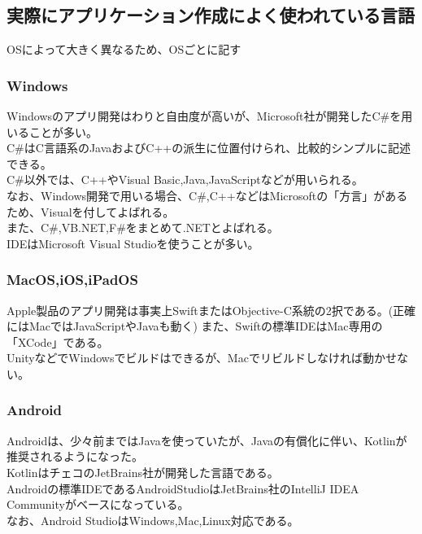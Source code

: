 \documentclass{ltjsarticle}
\begin{document}
\subsection{実際にアプリケーション作成によく使われている言語}
OSによって大きく異なるため、OSごとに記す
\subsubsection{Windows}
Windowsのアプリ開発はわりと自由度が高いが、Microsoft社が開発したC\#を用いることが多い。\\
C\#はC言語系のJavaおよびC++の派生に位置付けられ、比較的シンプルに記述できる。\\
C\#以外では、C++やVisual Basic,Java,JavaScriptなどが用いられる。\\
なお、Windows開発で用いる場合、C\#,C++などはMicrosoftの「方言」があるため、Visualを付してよばれる。\\
また、C\#,VB.NET,F\#をまとめて.NETとよばれる。\\
IDEはMicrosoft Visual Studioを使うことが多い。
\subsubsection{MacOS,iOS,iPadOS}
Apple製品のアプリ開発は事実上SwiftまたはObjective-C系統の2択である。(正確にはMacではJavaScriptやJavaも動く)
また、Swiftの標準IDEはMac専用の「XCode」である。\\
UnityなどでWindowsでビルドはできるが、Macでリビルドしなければ動かせない。
\subsubsection{Android}
Androidは、少々前まではJavaを使っていたが、Javaの有償化に伴い、Kotlinが推奨されるようになった。\\
KotlinはチェコのJetBrains社が開発した言語である。\\
Androidの標準IDEであるAndroidStudioはJetBrains社のIntelliJ IDEA Communityがベースになっている。\\
なお、Android StudioはWindows,Mac,Linux対応である。
\end{document}
